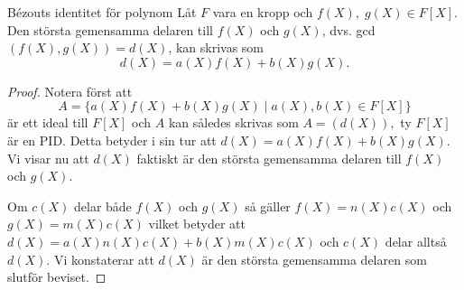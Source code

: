 \documentclass{article}
\theoremstyle{definition}
\begin{document}
\begin{mylemma}{Bézouts identitet för polynom}{}
  Låt $F$ vara en kropp och $f(X), \; g(X) \in F[X]$. Den största gemensamma delaren till $f(X)$ och $g(X)$, dvs. gcd$(f(X), g(X)) = d(X)$, kan skrivas som 
  \[d(X) = a(X)f(X) + b(X)g(X).\]
\end{mylemma}

\begin{proof}
  Notera först att 
  \[A = \{ a(X)f(X) + b(X)g(X) \; | \; a(X), b(X) \in F[X] \}\]
  är ett ideal till $F[X]$ och $A$ kan således skrivas som $A = (d(X)),$ ty $F[X]$ är en PID. Detta betyder i sin tur att 
  $d(X) = a(X)f(X) + b(X)g(X)$. Vi visar nu att $d(X)$ faktiskt är den största gemensamma delaren till $f(X)$ och $g(X)$.
  
  Om $c(X)$ delar både $f(X)$ och $g(X)$ så gäller $f(X) = n(X)c(X)$ och $g(X) = m(X)c(X)$ vilket betyder att 
  $d(X) = a(X)n(X)c(X) + b(X)m(X)c(X)$ och $c(X)$ delar alltså $d(X)$. Vi konstaterar att $d(X)$ är den största gemensamma delaren som 
  slutför beviset.
\end{proof}
\end{document}
